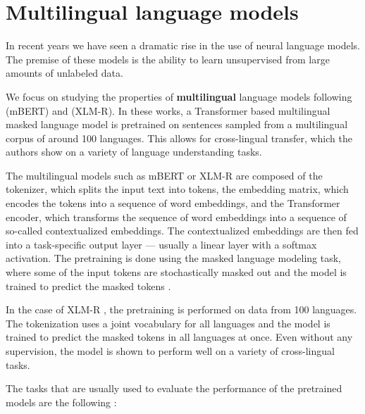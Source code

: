 \section{Multilingual language models}

In recent years we have seen a dramatic rise in the use of neural language models. The premise of these models is the ability to learn unsupervised from large amounts of unlabeled data. 

We focus on studying the properties of \textbf{multilingual} language models following \citet{devlin_bert_2019} (mBERT) and \citet{conneau_unsupervised_2020} (XLM-R). In these works, a Transformer \cite{vaswani_attention_nodate} based multilingual masked language model is pretrained on sentences sampled from a multilingual corpus of around 100 languages. This allows for cross-lingual transfer, which the authors show on a variety of language understanding tasks.

The multilingual models such as mBERT or XLM-R are composed of the tokenizer, which splits the input text into tokens, the embedding matrix, which encodes the tokens into a sequence of word embeddings, and the Transformer encoder, which transforms the sequence of word embeddings into a sequence of so-called contextualized embeddings. The contextualized embeddings are then fed into a task-specific output layer --- usually a linear layer with a softmax activation. The pretraining is done using the masked language modeling task, where some of the input tokens are stochastically masked out and the model is trained to predict the masked tokens \cite{devlin_bert_2019}.

In the case of XLM-R \cite{conneau_unsupervised_2020}, the pretraining is performed on data from 100 languages. The tokenization uses a joint vocabulary for all languages and the model is trained to predict the masked tokens in all languages at once. Even without any supervision, the model is shown to perform well on a variety of cross-lingual tasks.

The tasks that are usually used to evaluate the performance of the pretrained models are the following \cite{ruder_xtreme-r_2021}:

